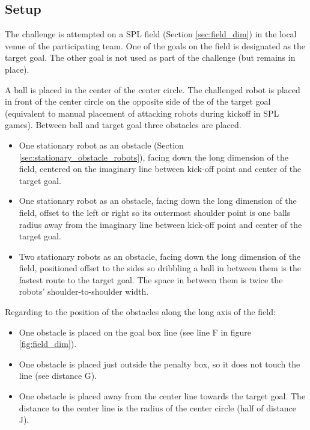 \subsection{Setup}

The challenge is attempted on a SPL field (\cf Section \ref{sec:field_dim}) in the local venue of the participating team. One of the goals on the field is designated as the target goal. The other goal is not used as part of the challenge (but remains in place).

A ball is placed in the center of the center circle. The challenged robot is placed in front of the center circle on the opposite side of the of the target goal (equivalent to manual placement of attacking robots during kickoff in SPL games). Between ball and target goal three obstacles are placed.

\begin{itemize}
	\item One stationary robot as an obstacle (\cf Section \ref{sec:stationary_obstacle_robots}), facing down the long dimension of the field, centered on the imaginary line between kick-off point and center of the target goal.
	\item One stationary robot as an obstacle, facing down the long dimension of the field, offset to the left or right so its outermost shoulder point is one balls radius away from the imaginary line between kick-off point and center of the target goal. %
	\item Two stationary robots as an obstacle, facing down the long dimension of the field, positioned offset to the sides so dribbling a ball in between them is the fastest route to the target goal. The space in between them is twice the robots' shoulder-to-shoulder width. %
\end{itemize}

Regarding to the position of the obstacles along the long axis of the field:

\begin{itemize}
	\item One obstacle is placed on the goal box line (see line F in figure \ref{fig:field_dim}).
	\item One obstacle is placed just outside the penalty box, so it does not touch the line (see distance  G).
	\item One obstacle is placed away from the center line towards the target goal. The distance to the center line is the radius of the center circle (half of distance J).
\end{itemize}

